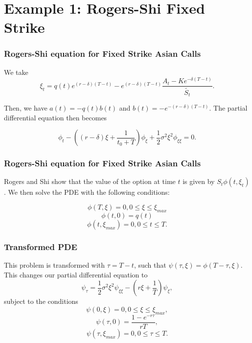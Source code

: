 \documentclass{beamer}
\begin{document}
  \section{Example 1: Rogers-Shi Fixed Strike}

  \begin{frame}
    \frametitle{Rogers-Shi equation for Fixed Strike Asian Calls}
    We take
    \begin{equation}
      \xi_t = q(t)e^{(r-\delta)(T-t)} - e^{(r-\delta)(T-t)}\frac{A_t - Ke^{-\delta(T-t)}}{\tilde{S_t}}.
    \end{equation}

    Then, we have \( a(t) = -q(t)b(t) \) and \(b(t) = -e^{-(r-\delta)(T-t)}\). The partial differential equation then becomes

    \begin{equation}
      \phi_t - ( (r-\delta)\xi + \frac{1}{t_0 + T} ) \phi_\xi + \frac{1}{2}\sigma^2\xi^2\phi_{\xi\xi} = 0.
    \end{equation}
  \end{frame}

  \begin{frame}
    \frametitle{Rogers-Shi equation for Fixed Strike Asian Calls}
    Rogers and Shi show that the value of the option at time \(t\) is given by \(S_t\phi(t, \xi_t)\). We then solve the PDE with the following conditions:

    \begin{equation}
      \phi(T, \xi) = 0, 0 \le \xi \le \xi_{max}
    \end{equation}
    \begin{equation}
      \phi(t, 0) = q(t)
    \end{equation}
    \begin{equation}
      \phi(t, \xi_{max}) = 0, 0 \le t \le T.
    \end{equation}
  \end{frame}

  \begin{frame}
    \frametitle{Transformed PDE}
    This problem is transformed with \(\tau = T - t \), such that \(\psi(\tau, \xi) = \phi(T-\tau, \xi)\). This changes our partial differential equation to
    \begin{equation}
      \psi_\tau = \frac{1}{2}\sigma^2\xi^2\psi_{\xi\xi} - (r\xi + \frac{1}{T})\psi_\xi,
    \end{equation}
    subject to the conditions
    \begin{equation}
      \psi(0, \xi) = 0, 0 \le \xi \le \xi_{max},
    \end{equation}
    \begin{equation}
      \psi(\tau, 0) = \frac{1-e^{-r\tau}}{rT},
    \end{equation}
    \begin{equation}
      \psi(\tau, \xi_{max}) = 0, 0 \le \tau \le T.
    \end{equation}
  \end{frame}
\end{document}
